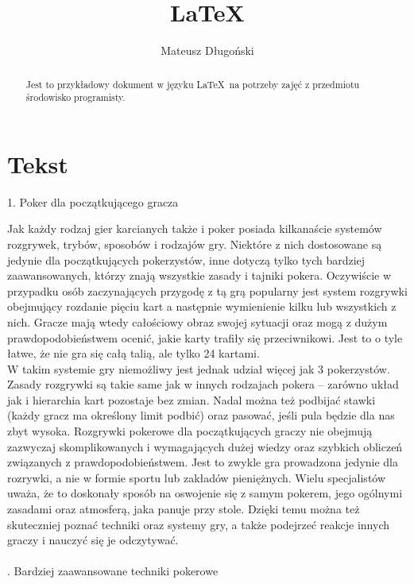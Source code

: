 \documentclass{article}
\title{\LaTeX}
\author{Mateusz Długoński}
\date{}
\begin{document}
\maketitle 

\begin{abstract}
Jest to przykładowy dokument w języku \LaTeX\ na potrzeby zajęć z przedmiotu środowisko programisty. 
\end{abstract}
\section{Tekst}\label{sec:tekst}
1. Poker dla początkującego gracza

Jak każdy rodzaj gier karcianych także i poker posiada kilkanaście systemów rozgrywek, trybów, sposobów i rodzajów gry. Niektóre z nich dostosowane są jedynie dla początkujących pokerzystów, inne dotyczą tylko tych bardziej zaawansowanych, którzy znają wszystkie zasady i tajniki pokera. Oczywiście w przypadku osób zaczynających przygodę z tą grą popularny jest system rozgrywki obejmujący rozdanie pięciu kart a następnie wymienienie kilku lub wszystkich z nich. Gracze mają wtedy całościowy obraz swojej sytuacji oraz mogą z dużym prawdopodobieństwem ocenić, jakie karty trafiły się przeciwnikowi. Jest to o tyle łatwe, że nie gra się całą talią, ale tylko 24 kartami.\\
W takim systemie gry niemożliwy jest jednak udział więcej jak 3 pokerzystów. Zasady rozgrywki są takie same jak w innych rodzajach pokera – zarówno układ jak i hierarchia kart pozostaje bez zmian. Nadal można też podbijać stawki (każdy gracz ma określony limit podbić) oraz pasować, jeśli pula będzie dla nas zbyt wysoka.
Rozgrywki pokerowe dla początkujących graczy nie obejmują zazwyczaj skomplikowanych i wymagających dużej wiedzy oraz szybkich obliczeń związanych z prawdopodobieństwem. Jest to zwykle gra prowadzona jedynie dla rozrywki, a nie w formie sportu lub zakładów pieniężnych. Wielu specjalistów uważa, że to doskonały sposób na oswojenie się z samym pokerem, jego ogólnymi zasadami oraz atmosferą, jaka panuje przy stole. Dzięki temu można też skuteczniej poznać techniki oraz systemy gry, a także podejrzeć reakcje innych graczy i nauczyć się je odczytywać.
\\
\\
. Bardziej zaawansowane techniki pokerowe
\end{document}
